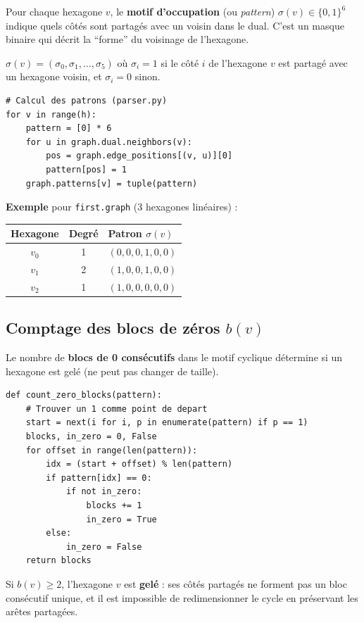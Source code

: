 Pour chaque hexagone $v$, le \textbf{motif d'occupation} (ou \textit{pattern})
$\sigma(v) \in \{0, 1\}^6$ indique quels côtés sont partagés avec un voisin dans le dual.
C'est un masque binaire qui décrit la ``forme'' du voisinage de l'hexagone.

\begin{definition}
  $\sigma(v) = (\sigma_0, \sigma_1, \ldots, \sigma_5)$ où $\sigma_i = 1$ si le côté $i$
  de l'hexagone $v$ est partagé avec un hexagone voisin, et $\sigma_i = 0$ sinon.
\end{definition}

\begin{lstlisting}
# Calcul des patrons (parser.py)
for v in range(h):
    pattern = [0] * 6
    for u in graph.dual.neighbors(v):
        pos = graph.edge_positions[(v, u)][0]
        pattern[pos] = 1
    graph.patterns[v] = tuple(pattern)
\end{lstlisting}

\textbf{Exemple} pour \texttt{first.graph} (3 hexagones linéaires) :
\begin{center}
\begin{tabular}{ccl}
  \toprule
  Hexagone & Degré & Patron $\sigma(v)$ \\
  \midrule
  $v_0$ & 1 & $(0, 0, 0, 1, 0, 0)$ \\
  $v_1$ & 2 & $(1, 0, 0, 1, 0, 0)$ \\
  $v_2$ & 1 & $(1, 0, 0, 0, 0, 0)$ \\
  \bottomrule
\end{tabular}
\end{center}

\subsection{Comptage des blocs de zéros $b(v)$}

Le nombre de \textbf{blocs de 0 consécutifs} dans le motif cyclique détermine si un hexagone
est gelé (ne peut pas changer de taille).

\begin{lstlisting}
def count_zero_blocks(pattern):
    # Trouver un 1 comme point de depart
    start = next(i for i, p in enumerate(pattern) if p == 1)
    blocks, in_zero = 0, False
    for offset in range(len(pattern)):
        idx = (start + offset) % len(pattern)
        if pattern[idx] == 0:
            if not in_zero:
                blocks += 1
                in_zero = True
        else:
            in_zero = False
    return blocks
\end{lstlisting}

Si $b(v) \geq 2$, l'hexagone $v$ est \textbf{gelé} : ses côtés partagés ne forment pas un
bloc consécutif unique, et il est impossible de redimensionner le cycle en préservant les
arêtes partagées.
